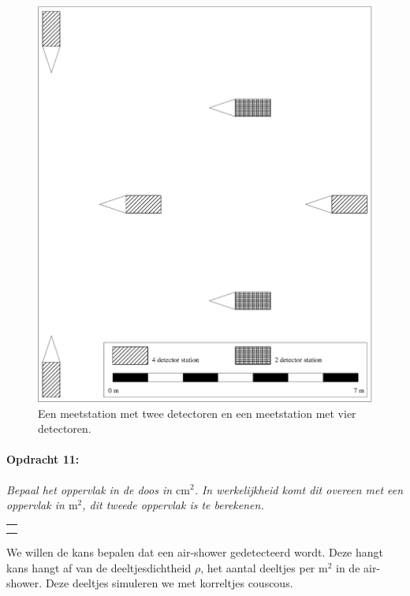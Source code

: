 \noindent \begin{center}
\begin{figure}[p]
\noindent \begin{centering}
\includegraphics[width=15.833cm]{Figures/station}
\par\end{centering}

\caption{\label{fig:Meetstations}Een meetstation met twee detectoren en een
meetstation met vier detectoren.}
\end{figure}

\par\end{center}

\begin{minipage}[t]{1\columnwidth}%

\paragraph{Opdracht 11:}

\textit{Bepaal het oppervlak in de doos in $\mathrm{cm^{2}}$. In
werkelijkheid komt dit overeen met een oppervlak in $\mathrm{m^{2}}$,
dit tweede oppervlak is te berekenen.}

\begin{tabular}{>{\raggedright}p{16.6cm}}
\tabularnewline
\hline 
\tabularnewline
\hline 
\tabularnewline
\hline 
\tabularnewline
\hline 
\end{tabular}%
\end{minipage}\bigskip{}
We willen de kans bepalen dat een air-shower gedetecteerd wordt. Deze
hangt kans hangt af van de deeltjesdichtheid $\rho$, het aantal deeltjes
per $\mathrm{m^{2}}$ in de air-shower. Deze deeltjes simuleren we
met korreltjes couscous.

